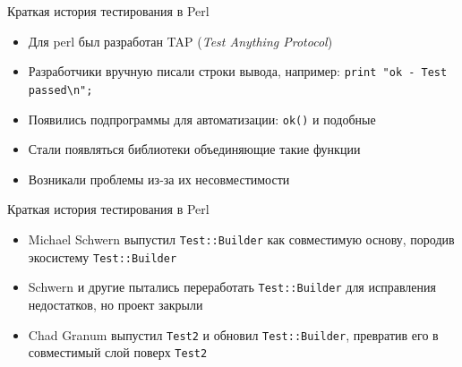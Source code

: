 \begin{frame}[fragile]{Краткая история тестирования в Perl}
    \begin{itemize}
        \item Для perl был разработан TAP (\textit{Test Anything Protocol})
        \vspace{0.25em}
        \item Разработчики вручную писали строки вывода, например: \texttt{print "ok - Test passed\textbackslash n";}
        \vspace{0.25em}
        \item Появились подпрограммы для автоматизации: \texttt{ok()} и подобные
        \vspace{0.25em}
        \item Стали появляться библиотеки объединяющие такие функции
        \vspace{0.25em}
        \item Возникали проблемы из-за их несовместимости
    \end{itemize}
\end{frame}

\begin{frame}[fragile]{Краткая история тестирования в Perl}
    \begin{itemize}
        \item Michael Schwern выпустил \texttt{Test::Builder} как совместимую основу, породив экосистему \texttt{Test::Builder}
        \vspace{0.25em}
        \item Schwern и другие пытались переработать \texttt{Test::Builder} для исправления недостатков, но проект закрыли
        \vspace{0.25em}
        \item Chad Granum выпустил \texttt{Test2} и обновил \texttt{Test::Builder}, превратив его в совместимый слой поверх \texttt{Test2}
    \end{itemize}
\end{frame}

